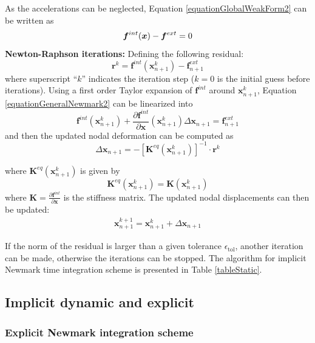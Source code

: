 \documentclass[oneside,11pt,times]{book}
\begin{document}
As the accelerations can be neglected, Equation \eqref{equationGlobalWeakForm2} can be written as
\begin{equation}
\centering
\bm{f}^{int}(\bm{x})-\bm{f}^{ext}=0
\label{eq:alpha1}
\end{equation}
\textbf{Newton-Raphson iterations:}
Defining the following residual:
\begin{equation} \label{equationResidualMomentum0}
 \bm{r}^{k} = \bm{f}^{int}(\bm{x}^{k}_{n+1}) - \bm{f}^{ext}_{n+1}
\end{equation}
where superscript ``$k$'' indicates the iteration step ($k = 0$ is the initial guess before iterations). Using a first order Taylor expansion of $\bm{f}^{int}$ around $\bm{x}^{k}_{n+1}$, Equation \eqref{equationGeneralNewmark2} can be linearized into
\begin{equation} \label{equationLinearizedBalanceMomentum0}
 \bm{f}^{int} (\bm{x}^{k}_{n+1}) + \frac{\partial \bm{f}^{int}}{\partial \bm{x}}(\bm{x}^{k}_{n+1})
 \Delta \bm{x}_{n+1} = \bm{f}^{ext}_{n+1}
\end{equation}
and then the updated nodal deformation can be computed as
\begin{equation} \label{equationUpdatedPosition0}
 \Delta \bm{x}_{n+1} = - [\bm{K}^{eq}(\bm{x}^{k}_{n+1})]^{-1} \cdot \bm{r}^{k}
\end{equation}

where $\bm{K}^{eq}(\bm{x}^{k}_{n+1})$ is given by
%
\begin{equation} \label{equationJacobianMatrix0}
 \bm{K}^{eq}(\bm{x}^{k}_{n+1}) = \bm{K} (\bm{x}^{k}_{n+1})
\end{equation}
%
where $\bm{K} = \frac{\partial \bm{f}^{int}}{\partial \bm{x}}$ is the stiffness matrix. The updated nodal displacements can then be updated:
\begin{eqnarray}\label{juli0}
 \bm{x}^{k+1}_{n+1}= \bm{x}^{k}_{n+1}+\Delta \bm{x}_{n+1}
\end{eqnarray}

If the norm of the residual is larger than a given tolerance $\epsilon_{\textrm{tol}}$, another iteration can be made, otherwise the iterations can be stopped. The algorithm for implicit Newmark time integration scheme is presented in Table \ref{tableStatic}.

\subsection{Implicit dynamic and explicit}

\subsubsection{Explicit Newmark integration scheme}
 \label{subsectionExplicitNewmarkScheme}
\end{document}
